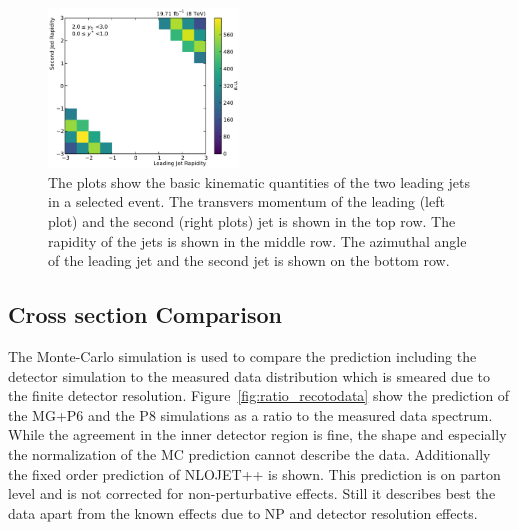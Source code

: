 \begin{figure}[htbp]
    \includegraphics[width=0.45\textwidth]{figures/measurement/jet12_rapidity_yb2ys0.pdf}
    \caption[Rapidities of the two leading jets in the various \ystar and \yboost bins]{
        The plots show the basic kinematic quantities of the two leading jets in a selected event.
             The transvers momentum of the leading (left plot) and the second (right plots) jet is shown
         in the top row. The rapidity of the jets is shown in the middle row. The azimuthal angle of the
     leading jet and the second jet is shown on the bottom row.}
    \label{fig:controlplots:rapidity}
\end{figure}

\subsection{Cross section Comparison}

The Monte-Carlo simulation is used to compare the prediction including the detector simulation
to the measured data distribution which is smeared due to the finite detector resolution. Figure~\ref{fig:ratio_recotodata}
show the prediction of the MG+P6 and the P8 simulations as a ratio to the measured data spectrum.
While the agreement in the inner detector region is fine, the shape and especially the normalization
of the MC prediction cannot describe the data. Additionally the fixed order prediction of NLOJET++
is shown. This prediction is on parton level and is not corrected for non-perturbative effects. Still
it describes best the data apart from the known effects due to NP and detector resolution effects.

